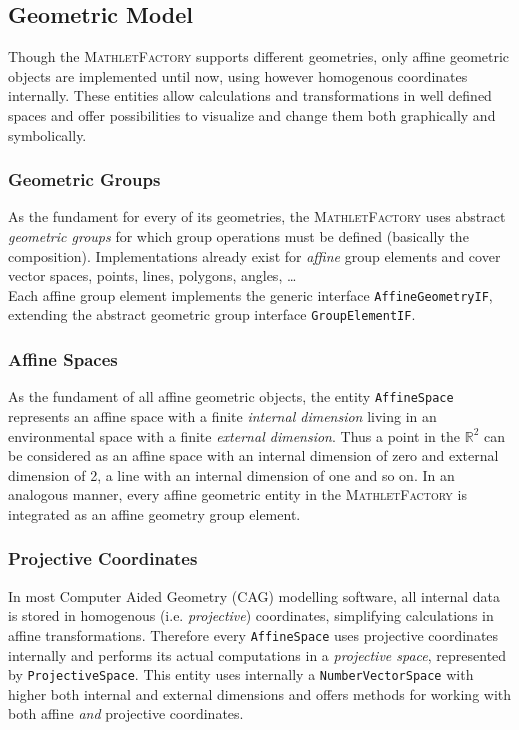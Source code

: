 \documentclass[a4paper,12pt]{article}
\newcommand{\name}[1]{\textsc{#1}}
\newcommand{\codename}[1]{\texttt{\small #1}}
\newcommand{\mf}{\name{MathletFactory }}
\begin{document}
\newpage

\subsection{Geometric Model}

Though the \mf supports different geometries, only affine geometric objects are implemented until now, using
however homogenous coordinates internally.
These entities allow calculations and transformations in well defined spaces and offer possibilities 
to visualize and change them both graphically and symbolically.

\subsubsection*{Geometric Groups}

As the fundament for every of its geometries, the \mf uses abstract \textit{geometric groups} for which
group operations must be defined (basically the composition). Implementations already exist for \textit{affine}
group elements and cover vector spaces, points, lines, polygons, angles, \ldots \\
Each affine group element implements the generic interface \codename{AffineGeometryIF}, extending the abstract
geometric group interface \codename{GroupElementIF}.

\subsubsection*{Affine Spaces}

As the fundament of all affine geometric objects, the entity \codename{AffineSpace} represents an affine space 
with a finite \textit{internal dimension} living in an environmental space with a finite \textit{external dimension}.
Thus a point in the $\mathbb{R}^2$ can be considered as an affine space with an internal dimension of zero
and external dimension of 2, a line with an internal dimension of one and so on. In an analogous manner,
every affine geometric entity in the \mf is integrated as an affine geometry group element.

\subsubsection*{Projective Coordinates}

In most Computer Aided Geometry (CAG) modelling software, all internal data is stored in homogenous
(i.e. \textit{projective}) coordinates, simplifying calculations in affine transformations.
Therefore every \codename{AffineSpace} uses projective coordinates internally and performs its actual 
computations in a \textit{projective space}, represented by \codename{ProjectiveSpace}. This entity uses
internally a \codename{NumberVectorSpace} with higher both internal and external dimensions and offers 
methods for working with both affine \textit{and} projective coordinates.
\end{document}
